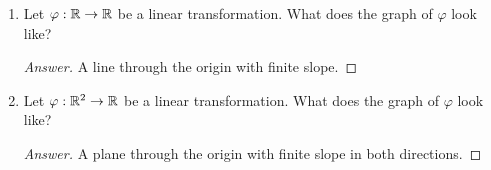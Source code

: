 \documentclass[../main.tex]{subfiles}
\begin{document}
\begin{exercise}\label{exr:19.4}\leavevmode
    \begin{enumerate}[label={(\alph*)}]
        \item Let $\varphi:\mathbb{R}\to\mathbb{R}$ be a linear transformation. What does the graph of $\varphi$ look like?
        \begin{proof}[Answer]
            A line through the origin with finite slope.
        \end{proof}
        \item Let $\varphi:\mathbb{R}^2\to\mathbb{R}$ be a linear transformation. What does the graph of $\varphi$ look like?
        \begin{proof}[Answer]
            A plane through the origin with finite slope in both directions.
        \end{proof}
    \end{enumerate}
\end{exercise}
\end{document}
